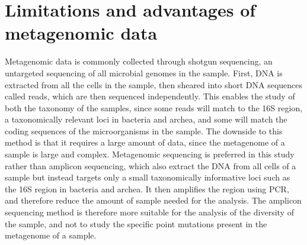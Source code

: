 \section{Limitations and advantages of metagenomic data}
Metagenomic data is commonly collected through shotgun sequencing, an untargeted sequencing of all microbial genomes in the sample\cite{quince2017ShotgunMetagenomicsSampling}.
First, DNA is extracted from all the cells in the sample, then sheared into short DNA sequences called reads, which are then sequenced independently\cite{sharpton2014IntroductionAnalysisShotgun}. 
This enables the study of both the taxonomy of the samples, since some reads will match to the 16S region, a taxonomically relevant loci in bacteria and archea, and some will match the coding sequences of the microorganisms in the sample. 
The downside to this method is that it requires a large amount of data, since the metagenome of a sample is large and complex. 
Metagenomic sequencing is preferred in this study rather than amplicon sequencing, which also extract the DNA from all cells of a sample but instead targets only a small taxonomically informative loci such as the 16S region in bacteria and archea. 
It then amplifies the region using PCR, and therefore reduce the amount of sample needed for the analysis.
The amplicon sequencing method is therefore more suitable for the analysis of the diversity of the sample, and not to study the specific point mutations present in the metagenome of a sample.



